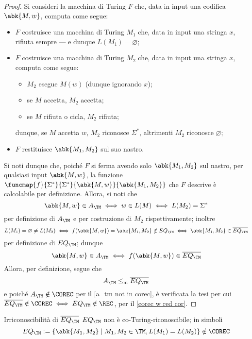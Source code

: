 \documentclass[a4paper, 12pt]{report}
\begin{document}
    \begin{proof}
        Si consideri la macchina di Turing $F$ che, data in input una codifica $\abk{M, w}$, computa come segue:

        \begin{itemize}
            \item $F$ costruisce una macchina di Turing $M_1$ che, data in input una stringa $x$, rifiuta sempre --- e dunque $L(M_1) = \varnothing$;
            \item $F$ costruisce una macchina di Turing $M_2$ che, data in input una stringa $x$, computa come segue:
                \begin{itemize}
                    \item $M_2$ esegue $M(w)$ (dunque ignorando $x$);
                    \item se $M$ accetta, $M_2$ accetta;
                    \item se $M$ rifiuta o cicla, $M_2$ rifiuta;
                \end{itemize}
                dunque, se $M$ accetta $w$, $M_2$ riconosce $\Sigma^*$, altrimenti $M_2$ riconosce $\varnothing$;
            \item $F$ restituisce $\abk{M_1, M_2}$ sul suo nastro.
        \end{itemize}

        Si noti dunque che, poiché $F$ si ferma avendo solo $\abk{M_1, M_2}$ sul nastro, per qualsiasi input $\abk{M, w}$, la funzione $\funcmap{f}{\Sigma^*}{\Sigma^*}{\abk{M, w}}{\abk{M_1, M_2}}$ che $F$ descrive è calcolabile per definizione. Allora, si noti che $$\abk{M, w} \in A_\TM \iff w \in L(M) \iff L(M_2) = \Sigma ^*$$ per definizione di $A_\TM$ e per costruzione di $M_2$ rispettivamente; inoltre $$L(M_1) = \varnothing \neq L(M_2) \iff f(\abk{M, w}) = \abk{M_1, M_2} \notin EQ_\TM \iff \abk{M_1, M_2} \in \overline{EQ_\TM}$$ per definizione di $EQ_\TM$; dunque $$\abk{M, w} \in A_\TM \iff f(\abk{M, w}) \in \overline{EQ_\TM}$$ Allora, per definizione, segue che $$A_\TM \leq_\mathrm m \overline{EQ_\TM}$$ e poiché $A_\TM \notin \COREC$ per il \cref{a_tm not in corec}, è verificata la tesi per cui $\overline{EQ_\TM} \notin \COREC \iff EQ_\TM \notin \REC$, per il \cref{corec w red cor}.
    \end{proof}

    \begin{framedthm}{Irriconoscibilità di $\overline{EQ_\TM}$}
        $EQ_\TM$ non è co-Turing-riconoscibile; in simboli $$EQ_\TM := \{\abk{M_1, M_2} \mid M_1, M_2 \in \TM, L(M_1) = L(M_2)\} \notin \COREC$$
    \end{framedthm}
\end{document}
